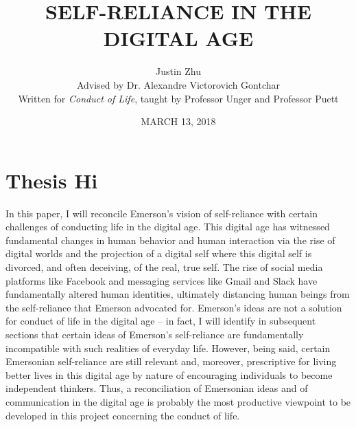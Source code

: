 \documentclass[12pt,letterpaper]{article}
\author{Justin Zhu \\ Advised by Dr. Alexandre Victorovich Gontchar \\ Written for \textit{Conduct of Life}, taught by Professor Unger and Professor Puett}
\title{SELF-RELIANCE IN THE DIGITAL AGE}
\date{MARCH 13, 2018}
\begin{document}
\maketitle
\pagebreak
\tableofcontents
\pagebreak
\section{Thesis Hi}
In this paper, I will reconcile Emerson's vision of
self-reliance with certain challenges of conducting life in the digital age.
This digital age has witnessed fundamental changes
in human behavior and human interaction via the rise of
digital worlds and the projection of a digital self where
this digital self is divorced, and often deceiving, of the real, true self.    The rise
of social media platforms like Facebook and messaging services like Gmail and Slack have fundamentally altered human identities, ultimately distancing human beings from the self-reliance that Emerson advocated for.  Emerson's ideas are not a solution for conduct of life in the digital age -- in fact, I will identify in subsequent sections that certain ideas of Emerson's self-reliance are fundamentally incompatible with such realities of everyday life.  However, being said, certain Emersonian self-reliance are still relevant and, moreover, prescriptive for living better lives in this digital age by nature of encouraging individuals to become independent thinkers.  Thus, a reconciliation of Emersonian ideas and of communication in the digital age is probably the most productive viewpoint to be developed in this project concerning the conduct of life.
\end{document}
